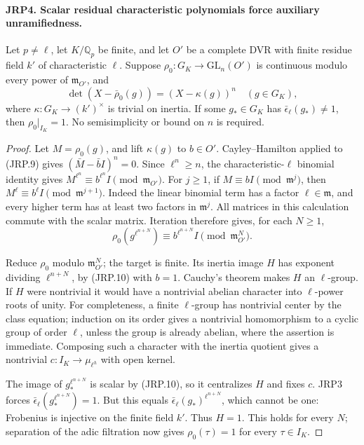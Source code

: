 \documentclass[11pt,a4paper]{article}
\numberwithin{equation}{section}
\theoremstyle{remark}\newtheorem{remark}[theorem]{Remark}
\begin{document}
\paragraph{JRP4. Scalar residual characteristic polynomials force auxiliary unramifiedness.}
\label{claim:JRP4}
Let \(p\ne\ell\), let \(K/\mathbb Q_p\) be finite, and let
\(O'\) be a complete DVR with finite residue field \(k'\) of
characteristic \(\ell\).  Suppose
\(\rho_0:G_K\to\mathrm{GL}_n(O')\) is continuous modulo every
power of \(\mathfrak m_{O'}\), and
\[
 \det(X-\bar\rho_0(g))=(X-\kappa(g))^n
                  \quad(g\in G_K),
 \tag{JRP.9}
\]
where \(\kappa:G_K\to(k')^\times\) is trivial on inertia.
If some \(g_*\in G_K\) has
\(\bar\epsilon_\ell(g_*)\ne1\), then
\(\rho_0|_{I_K}=1\).  No semisimplicity or bound on \(n\)
is required.
\begin{proof}
Let \(M=\rho_0(g)\), and lift \(\kappa(g)\) to \(b\in O'\).
Cayley--Hamilton applied to (JRP.9) gives
\((\bar M-\bar b I)^n=0\).  Since \(\ell^n\ge n\),
the characteristic-\(\ell\) binomial identity gives
\(M^{\ell^n}\equiv b^{\ell^n}I\pmod{\mathfrak m_{O'}}\).
For \(j\ge1\), if \(M\equiv bI\pmod{\mathfrak m^j}\),
then
\(M^\ell\equiv b^\ell I\pmod{\mathfrak m^{j+1}}\).
Indeed the linear binomial term has a factor \(\ell\in\mathfrak m\),
and every higher term has at least two factors in \(\mathfrak m^j\).
All matrices in this calculation commute with the scalar matrix.
Iteration therefore gives, for each \(N\ge1\),
\[
 \rho_0(g^{\ell^{n+N}})
       \equiv b^{\ell^{n+N}}I\pmod{\mathfrak m_{O'}^N}.
 \tag{JRP.10}
\]

Reduce \(\rho_0\) modulo \(\mathfrak m_{O'}^N\); the target
is finite.  Its inertia image \(H\) has exponent dividing
\(\ell^{n+N}\), by (JRP.10) with \(b=1\).
Cauchy's theorem makes \(H\) an \(\ell\)-group.  If \(H\)
were nontrivial it would have a nontrivial abelian character into
\(\ell\)-power roots of unity.  For completeness, a finite
\(\ell\)-group has nontrivial center by the class equation;
induction on its order gives a nontrivial homomorphism to a cyclic
group of order \(\ell\), unless the group is already abelian,
where the assertion is immediate.  Composing such a character with
the inertia quotient gives a nontrivial
\(c:I_K\to\mu_{\ell^h}\) with open kernel.

The image of \(g_*^{\ell^{n+N}}\) is scalar by (JRP.10), so
it centralizes \(H\) and fixes \(c\).  JRP3 forces
\(\bar\epsilon_\ell(g_*^{\ell^{n+N}})=1\).
But this equals
\(\bar\epsilon_\ell(g_*)^{\ell^{n+N}}\), which cannot be one:
Frobenius is injective on the finite field \(k'\).
Thus \(H=1\).  This holds for every \(N\); separation of the
adic filtration now gives \(\rho_0(\tau)=1\) for every
\(\tau\in I_K\).
\end{proof}
\end{document}
